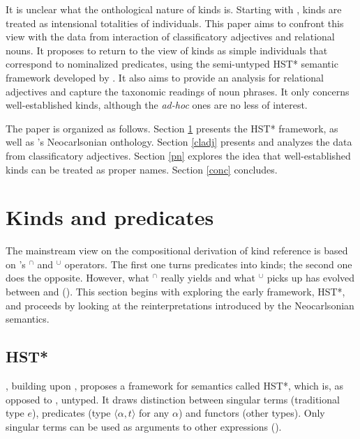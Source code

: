 \documentclass[a4paper, 12pt]{article}
\begin{document}
It is unclear what the onthological nature of kinds is. Starting with \parencite{chierchia1998referencekindslanguages}, kinds are treated as intensional totalities of individuals. This paper aims to confront this view with the data from interaction of classificatory adjectives and relational nouns. It proposes to return to the view of kinds as simple individuals that correspond to nominalized predicates, using the semi-untyped HST* semantic framework developed by \textcite{cocchiarella1974fregeansemanticsrealist,chierchia1984topicssyntaxsemantics}. It also aims to provide an analysis for relational adjectives and capture the taxonomic readings of noun phrases. It only concerns well-established kinds, although the \textit{ad-hoc} ones are no less of interest.

The paper is organized as follows. Section \ref{chierchia} presents the HST* framework, as well as \textcite{chierchia1998referencekindslanguages}'s Neocarlsonian onthology. Section \ref{cladj} presents and analyzes the data from classificatory adjectives. Section \ref{pn} explores the idea that well-established kinds can be treated as proper names. Section \ref{conc} concludes.

\section{Kinds and predicates}\label{chierchia}

The mainstream view on the compositional derivation of kind reference is based on \citeauthor{chierchia1984topicssyntaxsemantics}'s $^\cap $ and $^\cup $ operators. The first one turns predicates into kinds; the second one does the opposite. However, what $^\cap $ really yields and what $^\cup $ picks up has evolved between \parencite{chierchia1984topicssyntaxsemantics} and (\citeyear{chierchia1998referencekindslanguages}). This section begins with exploring the early framework, HST*, and proceeds by looking at the reinterpretations introduced by the Neocarlsonian semantics.

\subsection{HST*}

\textcite{chierchia1984topicssyntaxsemantics}, building upon \textcite{cocchiarella1974fregeansemanticsrealist}, proposes a framework for semantics called HST*, which is, as opposed to \textcite{montague1973propertreatmentquantification}, untyped. It draws distinction between singular terms (traditional type $e$), predicates (type $\langle \alpha,t\rangle$ for any $\alpha$) and functors (other types).  Only singular terms can be used as arguments to other expressions (\nextx).
\end{document}
